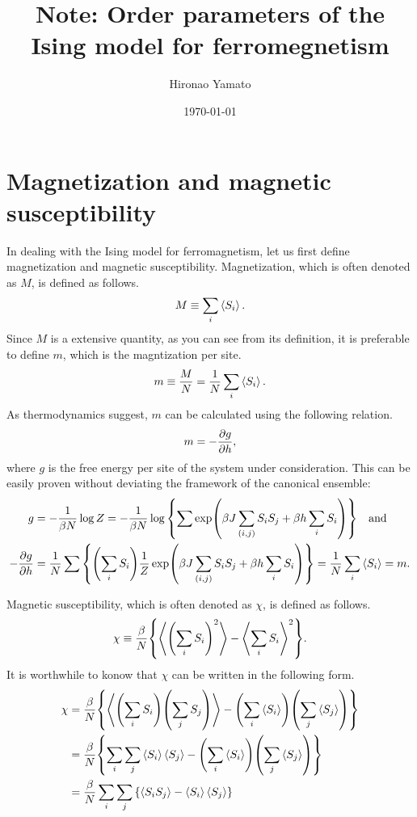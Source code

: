 \documentclass[aps, 12pt]{revtex4-2}
\begin{document}
\title{Note: Order parameters of the Ising model for ferromegnetism}
\author{Hironao Yamato}
\date{\today}
\maketitle

\section{Magnetization and magnetic susceptibility}
In dealing with the Ising model for ferromagnetism, let us first define magnetization and magnetic susceptibility. Magnetization, which is often denoted as $M$, is defined as follows.
\begin{align}
  M \equiv \sum_{i} \ev{S_i}.
\end{align}
Since $M$ is a extensive quantity, as you can see from its definition, it is preferable to define $m$, which is the magntization per site.
\begin{align}
  m \equiv \frac{M}{N} = \frac{1}{N} \sum_i \ev{S_i}.
\end{align}
As thermodynamics suggest, $m$ can be calculated using the following relation.
\begin{align}
  m = -\pdv{g}{h},
\end{align}
where $g$ is the free energy per site of the system under consideration. This can be easily proven without deviating the framework of the canonical ensemble:
\begin{align}
  g &= -\frac{1}{\beta N} \log Z = -\frac{1}{\beta N} \log \qty{ \sum \exp(\beta J \sum_{(i, j)}S_iS_j + \beta h \sum_i S_i)} \quad \text{and}\\
  - \pdv{g}{h} &= \frac{1}{N} \sum \qty{\qty(\sum_i S_i)\frac{1}{Z}\exp(\beta J \sum_{(i, j)}S_iS_j + \beta h \sum_i S_i)} = \frac{1}{N} \sum_i \ev{S_i} = m.
\end{align}

Magnetic susceptibility, which is often denoted as $\chi$, is defined as follows.
\begin{align}
  \chi \equiv \frac{\beta}{N}\qty{\ev{\qty(\sum_iS_i)^2} - \ev{\sum_iS_i}^2}.
\end{align}
It is worthwhile to konow that $\chi$ can be written in the following form.
\begin{align}
  \chi &= \frac{\beta}{N}\qty{\ev{\qty(\sum_i S_i)\qty(\sum_j S_j)} - \qty(\sum_i\ev{S_i})\qty(\sum_j\ev{S_j})} \\
  &= \frac{\beta}{N}\qty{\sum_i\sum_j \ev{S_i}\ev{S_j} - \qty(\sum_i\ev{S_i})\qty(\sum_j\ev{S_j})} \\
  &= \frac{\beta}{N}\sum_i\sum_j \qty{\ev{S_iS_j} - \ev{S_i}\ev{S_j}}
\end{align}

\end{document}
